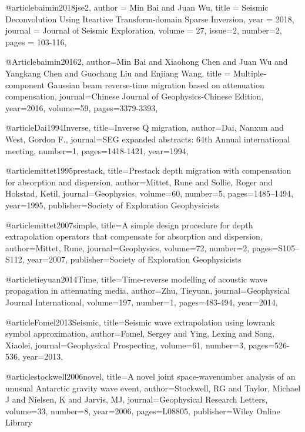 @article{baimin2018jse2,
  author =	 {Min Bai and Juan Wu},
  title =	 {Seismic Deconvolution Using Iteartive Transform-domain Sparse Inversion},
  year =	 2018,
  journal =	 {Journal of Seismic Exploration},
  volume =	 27,
  issue=2,
  number=2,
  pages =	 {103-116},
}



@Article{baimin20162,
  author={Min Bai and Xiaohong Chen and Juan Wu and Yangkang Chen and Guochang Liu and  Enjiang Wang},
  title = {Multiple-component Gaussian beam reverse-time migration based on attenuation compensation},
  journal={Chinese Journal of Geophysics-Chinese Edition},
  year=2016,
  volume=59,
  pages={3379-3393},
}

@article{Dai1994Inverse,
  title={Inverse {Q} migration},
  author={Dai, Nanxun and West, Gordon F.},
  journal={SEG expanded abstracts: 64th Annual international meeting},
  number={1},
  pages={1418-1421},
  year={1994},
}

@article{mittet1995prestack,
  title={Prestack depth migration with compensation for absorption and dispersion},
  author={Mittet, Rune and Sollie, Roger and Hokstad, Ketil},
  journal={Geophysics},
  volume={60},
  number={5},
  pages={1485--1494},
  year={1995},
  publisher={Society of Exploration Geophysicists}
}

@article{mittet2007simple,
  title={A simple design procedure for depth extrapolation operators that compensate for absorption and dispersion},
  author={Mittet, Rune},
  journal={Geophysics},
  volume={72},
  number={2},
  pages={S105--S112},
  year={2007},
  publisher={Society of Exploration Geophysicists}
}

@article{tieyuan2014Time,
  title={Time-reverse modelling of acoustic wave propagation in attenuating media},
  author={Zhu, Tieyuan},
  journal={Geophysical Journal International},
  volume={197},
  number={1},
  pages={483-494},
  year={2014},
}

@article{Fomel2013Seismic,
  title={Seismic wave extrapolation using lowrank symbol approximation},
  author={Fomel, Sergey and Ying, Lexing and Song, Xiaolei},
  journal={Geophysical Prospecting},
  volume={61},
  number={3},
  pages={526-536},
  year={2013},
}

@article{stockwell2006novel,
  title={A novel joint space-wavenumber analysis of an unusual Antarctic gravity wave event},
  author={Stockwell, RG and Taylor, Michael J and Nielsen, K and Jarvis, MJ},
  journal={Geophysical Research Letters},
  volume={33},
  number={8},
  year={2006},
  pages={L08805},
  publisher={Wiley Online Library}
}

